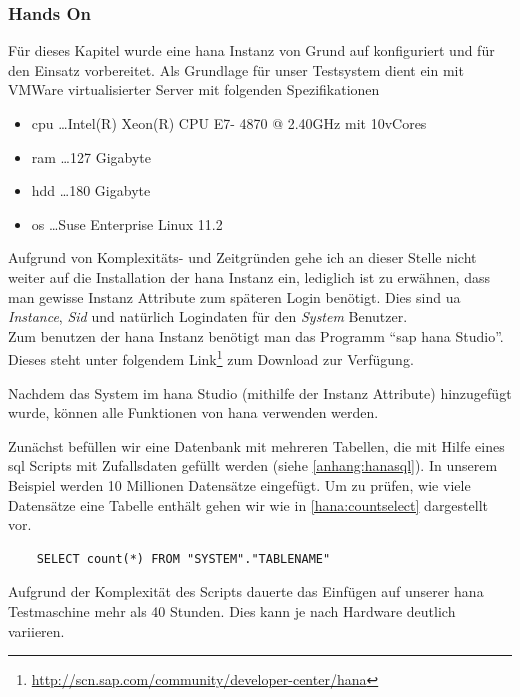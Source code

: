 \subsubsection{Hands On}
\label{sec:db-hana-ho}
Für dieses Kapitel wurde eine \gls{hana} Instanz von Grund auf konfiguriert und für den Einsatz vorbereitet. 
Als Grundlage für unser Testsystem dient ein mit VMWare virtualisierter Server mit folgenden Spezifikationen
\begin{itemize}
	\item \gls{cpu} \ldots Intel(R) Xeon(R) CPU E7- 4870  @ 2.40GHz mit 10vCores
	\item \gls{ram} \ldots 127 Gigabyte
	\item \gls{hdd} \ldots 180 Gigabyte
	\item \gls{os} \ldots Suse Enterprise Linux 11.2	
\end{itemize}

Aufgrund von Komplexitäts- und Zeitgründen gehe ich an dieser Stelle nicht weiter auf die Installation der \gls{hana} Instanz ein, lediglich ist zu erwähnen, dass man gewisse Instanz Attribute zum späteren Login benötigt. Dies sind \gls{ua} \emph{Instance}, \emph{Sid} und natürlich Logindaten für den \emph{System} Benutzer.\\
Zum benutzen der \gls{hana} Instanz benötigt man das Programm "`\gls{sap} \gls{hana} Studio"'. Dieses steht unter folgendem Link\footnote{\url{http://scn.sap.com/community/developer-center/hana}} zum Download zur Verfügung.

Nachdem das System im \gls{hana} Studio (mithilfe der Instanz Attribute) hinzugefügt wurde, können alle Funktionen von \gls{hana} verwenden werden.

Zunächst befüllen wir eine Datenbank mit mehreren Tabellen, die mit Hilfe eines \gls{sql} Scripts mit Zufallsdaten gefüllt werden (siehe \ref{anhang:hanasql}). In unserem Beispiel werden 10 Millionen Datensätze eingefügt. Um zu prüfen, wie viele Datensätze eine Tabelle enthält gehen wir wie in \ref{hana:countselect} dargestellt vor.

\begin{lstlisting}
	SELECT count(*) FROM "SYSTEM"."TABLENAME"
\end{lstlisting}

Aufgrund der Komplexität des Scripts dauerte das Einfügen auf unserer \gls{hana} Testmaschine mehr als 40 Stunden. Dies kann je nach Hardware deutlich variieren.\\

